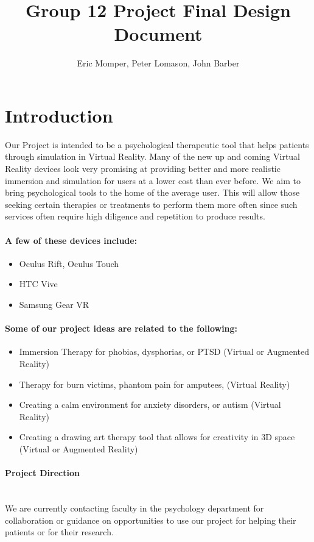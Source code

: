 \documentclass[a4paper,10pt]{article}
\title{Group 12 Project Final Design Document}
\author{Eric Momper, Peter Lomason, John Barber}
\begin{document}
	
\maketitle
	
	\pagebreak
	\tableofcontents
	\pagebreak
	
	\section{Introduction}
		Our Project is intended to be a psychological therapeutic tool that helps patients through simulation in Virtual Reality.
	Many of the new up and coming Virtual Reality devices look very promising at providing better and more realistic immersion and simulation for users at a lower cost than ever before. We aim to bring psychological tools to the home of the average user. This will allow those seeking certain therapies or treatments to perform them more often since such services often require high diligence and repetition to produce results.
	
	\paragraph{A few of these devices include:}
	\begin{itemize}
		\item Oculus Rift, Oculus Touch
		\item HTC Vive
		\item Samsung Gear VR
	\end{itemize}
	
	\paragraph{ Some of our project ideas are related to the following:}
	\begin{itemize}
		\item ​Immersion Therapy for phobias, dysphorias, or PTSD (Virtual or Augmented Reality)
		\item Therapy for burn victims, phantom pain for amputees,  (Virtual Reality)
		\item Creating a calm environment for  anxiety disorders, or autism (Virtual Reality)
		\item Creating a drawing art therapy tool that allows for creativity in 3D space (Virtual or Augmented Reality)
	\end{itemize}
	
	
	\paragraph{Project Direction} ~\\ We are currently contacting faculty in the psychology department for collaboration or guidance on opportunities to use our project for helping their patients or for their research.
\end{document}
